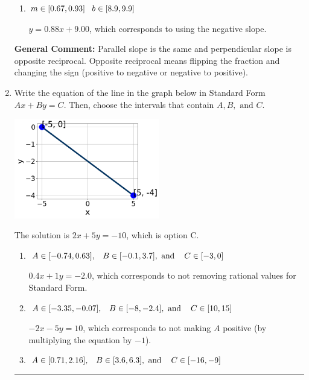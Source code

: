 \documentclass{extbook}[14pt]
\newcommand{\litem}[1]{\item #1

\rule{\textwidth}{0.4pt}}
\begin{document}
\begin{enumerate}
{\begin{enumerate}[label=\Alph*.]
 $y = -1.14x - 5.00$, which corresponds to using the reciprocal slope $(1/m)$.
\item \( m \in [0.67, 0.93] \hspace*{3mm} b \in [8.9, 9.9] \)

 $y = 0.88x + 9.00$, which corresponds to using the negative slope.
\end{enumerate}

\textbf{General Comment:} Parallel slope is the same and perpendicular slope is opposite reciprocal. Opposite reciprocal means flipping the fraction and changing the sign (positive to negative or negative to positive).
}
\litem{
Write the equation of the line in the graph below in Standard Form $Ax+By=C$. Then, choose the intervals that contain $A, B, \text{ and } C$.

\begin{center}
    \includegraphics[width=0.5\textwidth]{../Figures/linearGraphToStandardB.png}
\end{center}


The solution is \( 2x + 5y = -10 \), which is option C.\begin{enumerate}[label=\Alph*.]
\item \( A \in [-0.74, 0.63], \hspace{3mm} B \in [-0.1, 3.7], \text{ and } \hspace{3mm} C \in [-3, 0] \)

 $0.4x + 1y = -2.0$, which corresponds to not removing rational values for Standard Form.
\item \( A \in [-3.35, -0.07], \hspace{3mm} B \in [-8, -2.4], \text{ and } \hspace{3mm} C \in [10, 15] \)

 $-2x - 5y = 10$, which corresponds to not making $A$ positive (by multiplying the equation by $-1$).
\item \( A \in [0.71, 2.16], \hspace{3mm} B \in [3.6, 6.3], \text{ and } \hspace{3mm} C \in [-16, -9] \)


\end{enumerate}}
\end{enumerate}
\end{document}
